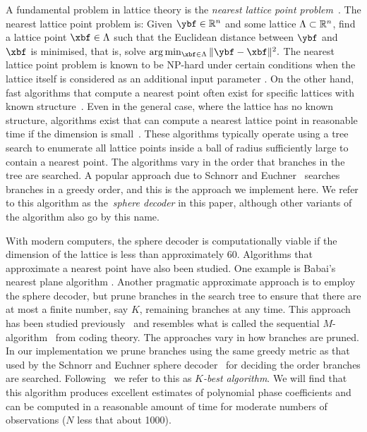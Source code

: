 \documentclass[journal]{IEEEtran}
\begin{document}
A fundamental problem in lattice theory is the \emph{nearest lattice point problem}~\cite{Agrell2002}. The nearest lattice point problem is: Given $\ybf\in\reals^n$ and some lattice $\Lambda \subset {\mathbb R}^n$, find a lattice point $\xbf \in \Lambda$ such that the Euclidean distance between $\ybf$ and $\xbf$ is minimised, that is, solve $\arg\min_{\xbf \in \Lambda} \|\ybf - \xbf\|^2.$  The nearest lattice point problem is known to be NP-hard under certain conditions when the lattice itself is considered as an additional input parameter \cite{micciancio_hardness_2001, AjtaiShortestVecProbNPHard1998}.  On the other hand,  fast algorithms that compute a nearest point often exist for specific lattices with known structure~\cite{SPLAG,Conway1982FastQuantDec,McKilliam2009CoxeterLattices,McKilliam2008}.  Even in the general case, where the lattice has no known structure, algorithms exist that can compute a nearest lattice point in reasonable time if the dimension is small~\cite{Agrell2002, Viterbo_sphere_decoder_1999, Pohst_sphere_decoder_1981}. These algorithms typically operate using a tree search to enumerate all lattice points inside a ball of radius sufficiently large to contain a nearest point.  The algorithms vary in the order that branches in the tree are searched.  A popular approach due to Schnorr and Euchner~\cite{schnorr_euchner_sd_1994,Agrell2002} searches branches in a greedy order, and this is the approach we implement here.  We refer to this algorithm as the~\emph{sphere decoder} in this paper, although other variants of the algorithm also go by this name.  

With modern computers, the sphere decoder is computationally viable if the dimension of the lattice is less than approximately $60$.  Algorithms that approximate a nearest point have also been studied.  One example is Babai's nearest plane algorithm \cite{Babai1986}.  Another pragmatic approximate approach is to employ the sphere decoder, but prune branches in the search tree to ensure that there are at most a finite number, say $K$, remaining branches at any time.  This approach has been studied previously~\cite{Baro_list_sphere_dec_2003,Zhan2006_K_best_sphere_decoder,Mondal_Kbest_again_2009} and resembles what is called the sequential $M$-algorithm~\citep{Anderson1984_seq_coding_alg} from coding theory.  The approaches vary in how branches are pruned.  In our implementation we prune branches using the same greedy metric as that used by the Schnorr and Euchner sphere decoder~\cite{schnorr_euchner_sd_1994,Agrell2002} for deciding the order branches are searched.  Following~\cite{Zhan2006_K_best_sphere_decoder} we refer to this as \emph{$K$-best algorithm}.  We will find that this algorithm produces excellent estimates of polynomial phase coefficients and can be computed in a reasonable amount of time for moderate numbers of observations ($N$ less that about 1000).
\end{document}
